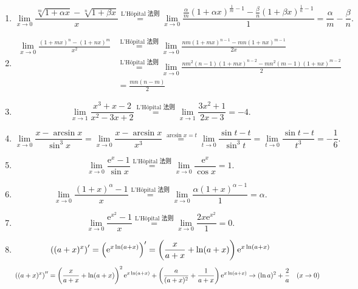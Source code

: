 \begin{solution}
    \begin{enumerate}
        \item $$\displaystyle \lim_{x \to 0} \frac{\sqrt[m]{1 + \alpha x} - \sqrt[n]{1 + \beta x}}{x} \overset{\text{L'Hôpital 法则}}{=} \lim_{x \to 0} \frac{\frac{\alpha}{m}(1 + \alpha x)^{\frac{1}{m} - 1} - \frac{\beta}{n}(1 + \beta x)^{\frac{1}{n} - 1}}{1} = \frac{\alpha}{m} - \frac{\beta}{n}.$$
        \item \begin{align*}
                  \lim_{x \to 0} \frac{(1 + m x)^n - (1 + n x)^m}{x^2} & \overset{\text{L'Hôpital 法则}}{=} \lim_{x \to 0} \frac{n m (1 + m x)^{n - 1} - m n (1 + n x)^{m - 1}}{2x}                  \\
                                                                       & \overset{\text{L'Hôpital 法则}}{=} \lim_{x \to 0} \frac{n m^2 (n - 1)(1 + m x)^{n - 2} - m n^2 (m - 1)(1 + n x)^{m - 2}}{2} \\
                                                                       & = \frac{mn(n-m)}{2}
              \end{align*}
        \item $$\lim_{x \to 1} \frac{x^3 + x - 2}{x^2 - 3x + 2} \overset{\text{L'Hôpital 法则}}{=} \lim_{x \to 1} \frac{3x^2 + 1}{2x - 3} = -4.$$
        \item $$\lim_{x \to 0} \frac{x - \arcsin x}{\sin^3 x} = \lim_{x\to 0} \frac{x - \arcsin x}{x^3} \overset{\arcsin x = t}{=} \lim_{t \to 0} \frac{\sin t - t}{\sin^3 t} = \lim_{t \to 0} \frac{\sin t - t}{t^3}= -\frac{1}{6}.$$
        \item $$\lim_{x \to 0} \frac{\mathrm{e}^x - 1}{\sin x} \overset{\text{L'Hôpital 法则}}{=} \lim_{x \to 0} \frac{\mathrm{e}^x}{\cos x} = 1.$$
        \item $$\lim_{x \to 0} \frac{(1 + x)^\alpha - 1}{x} \overset{\text{L'Hôpital 法则}}{=} \lim_{x \to 0} \frac{\alpha (1 + x)^{\alpha - 1}}{1} = \alpha.$$
        \item $$\lim_{x \to 0} \frac{\mathrm{e}^{x^2} - 1}{x} \overset{\text{L'Hôpital 法则}}{=} \lim_{x \to 0} \frac{2x \mathrm{e}^{x^2}}{1} = 0.$$
        \item $$\left( (a+x)^x \right)' = \left( \mathrm{e}^{x\ln(a+x)} \right)' = \left( \frac{x}{a+x} + \ln(a+x) \right)\mathrm{e}^{x\ln(a+x)}$$
              $$\left( (a+x)^x \right)'' =  \left( \frac{x}{a+x} + \ln(a+x) \right)^2 \mathrm{e}^{x\ln(a+x)} + \left( \frac{a}{(a+x)^2} + \frac{1}{a+x} \right) \mathrm{e}^{x\ln(a+x)} \to (\ln a)^2 + \frac{2}{a} \quad (x \to 0)$$

\end{enumerate}
\end{solution}
